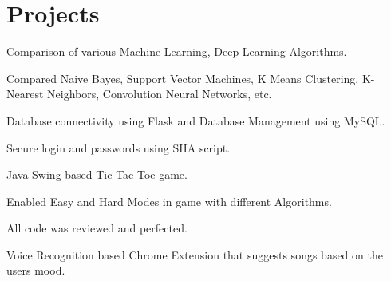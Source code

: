 \documentclass[12pt]{deedy-resume-openfont}
\begin{document}

\section{Projects}

\vspace{\topsep} %
\begin{tightemize}
\item Comparison of various Machine Learning, Deep Learning Algorithms.
\item Compared Naive Bayes, Support Vector Machines, K Means Clustering, K-Nearest Neighbors, Convolution Neural Networks, etc.
\end{tightemize}
\sectionsep


\vspace{\topsep} %
\begin{tightemize}
\item Database connectivity using Flask and Database Management using MySQL.
\item Secure login and passwords using SHA script.
\end{tightemize}
\sectionsep

\vspace{\topsep} 
\begin{tightemize}
\item Java-Swing based Tic-Tac-Toe game.
\item Enabled Easy and Hard Modes in game with different Algorithms.
\item All code was reviewed and perfected.
\end{tightemize}
\sectionsep

\vspace{\topsep} 
\begin{tightemize}
\item Voice Recognition based Chrome Extension that suggests songs based on the users mood.
\end{tightemize}
\sectionsep
\end{document}
